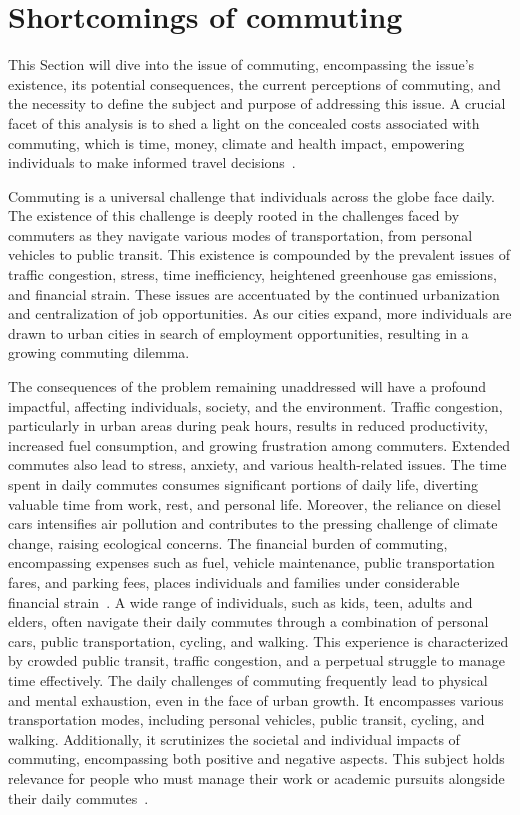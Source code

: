 \section{Shortcomings of commuting}\label{sec:shortcomings-of-commuting}

This Section will dive into the issue of commuting, encompassing the issue's existence, its potential consequences,
the current perceptions of commuting, and the necessity to define the subject and purpose of addressing this issue.
A crucial facet of this analysis is to shed a light on the concealed costs associated with commuting, which is time,
money, climate and health impact, empowering individuals to make informed travel decisions~\cite{alma9921355859805762}.

Commuting is a universal challenge that individuals across the globe face daily.
The existence of this challenge is deeply rooted in the challenges faced by commuters as they navigate various modes of
transportation, from personal vehicles to public transit.
This existence is compounded by the prevalent issues of traffic congestion, stress, time inefficiency, heightened
greenhouse gas emissions, and financial strain.
These issues are accentuated by the continued urbanization and centralization of job opportunities.
As our cities expand, more individuals are drawn to urban cities in search of employment opportunities, resulting in a
growing commuting dilemma.

The consequences of the problem remaining unaddressed will have a profound impactful, affecting individuals, society,
and the environment.
Traffic congestion, particularly in urban areas during peak hours, results in reduced productivity, increased fuel
consumption, and growing frustration among commuters.
Extended commutes also lead to stress, anxiety, and various health-related issues.
The time spent in daily commutes consumes significant portions of daily life, diverting valuable time from work,
rest, and personal life.
Moreover, the reliance on diesel cars intensifies air pollution and contributes to the pressing challenge of
climate change, raising ecological concerns.
The financial burden of commuting, encompassing expenses such as fuel, vehicle maintenance, public transportation fares,
and parking fees, places individuals and families under considerable financial strain~\cite{alma9921355859805762}.
A wide range of individuals, such as kids, teen, adults and elders, often navigate their daily commutes through a
combination of personal cars, public transportation, cycling, and walking.
This experience is characterized by crowded public transit, traffic congestion, and a perpetual struggle to manage time
effectively.
The daily challenges of commuting frequently lead to physical and mental exhaustion, even in the face of urban growth.
It encompasses various transportation modes, including personal vehicles, public transit, cycling, and walking.
Additionally, it scrutinizes the societal and individual impacts of commuting, encompassing both positive and negative
aspects.
This subject holds relevance for people who must manage their work or academic pursuits alongside their daily
commutes~\cite{alma9921355859805762}.

